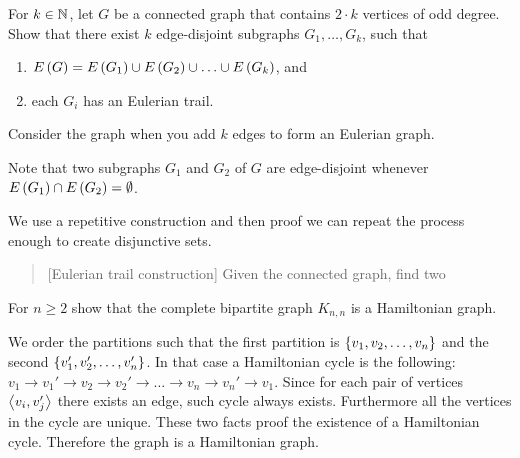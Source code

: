 \documentclass{article}
\begin{document}
\begin{exercise}
For $k\in\mathbb{N}$, let $G$ be a connected graph that contains $2\cdot k$ vertices of odd degree. Show that there exist $k$ edge-disjoint subgraphs $G_1,\ldots,G_k$, such that
\begin{enumerate}
 \item $E\left( G \right)=E\left( G_1 \right)\cup E\left( G_2 \right)\cup\ldots\cup E\left( G_k \right)$, and
 \item each $G_i$ has an Eulerian trail.
\end{enumerate}
\begin{hint}
Consider the graph when you add $k$ edges to form an Eulerian graph.
\end{hint}
\begin{note}
Note that two subgraphs $G_1$ and $G_2$ of $G$ are edge-disjoint whenever $E\left( G_1 \right)\cap E\left( G_2 \right)=\emptyset$.
\begin{answer}
We use a repetitive construction and then proof we can repeat the process enough to create disjunctive sets.
\begin{quote}[Eulerian trail construction]
Given the connected graph, find two 
\end{quote}

\end{answer}
\end{note}
\end{exercise}

\begin{exercise}
For $n\geq2$ show that the complete bipartite graph $K_{n,n}$ is a Hamiltonian graph.
\begin{answer}
We order the partitions such that the first partition is $\left\{ v_1,v_2,\ldots,v_n \right\}$ and the second $\left\{ v_1',v_2',\ldots,v_n' \right\}$. In that case a Hamiltonian cycle is the following: $v_1\rightarrow v_1'\rightarrow v_2\rightarrow v_2'\rightarrow\ldots\rightarrow v_n\rightarrow v_n'\rightarrow v_1$. Since for each pair of vertices $\left\langle v_i,v_j' \right\rangle$ there exists an edge, such cycle always exists. Furthermore all the vertices in the cycle are unique. These two facts proof the existence of a Hamiltonian cycle. Therefore the graph is a Hamiltonian graph.
\end{answer}
\end{exercise}
\end{document}

